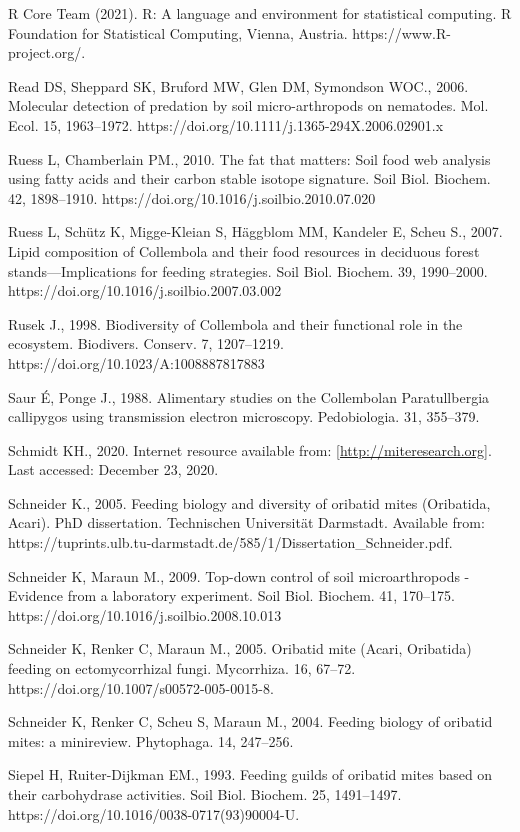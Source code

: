 \documentclass[10pt,oneside]{article}
\begin{document}
R Core Team (2021). R: A language and environment for statistical
computing. R Foundation for Statistical Computing, Vienna, Austria.
https://www.R-project.org/.

Read DS, Sheppard SK, Bruford MW, Glen DM, Symondson WOC., 2006.
Molecular detection of predation by soil micro-arthropods on nematodes.
Mol. Ecol. 15, 1963--1972.
https://doi.org/10.1111/j.1365-294X.2006.02901.x

Ruess L, Chamberlain PM., 2010. The fat that matters: Soil food web
analysis using fatty acids and their carbon stable isotope signature.
Soil Biol. Biochem. 42, 1898--1910.
https://doi.org/10.1016/j.soilbio.2010.07.020

Ruess L, Schütz K, Migge-Kleian S, Häggblom MM, Kandeler E, Scheu S.,
2007. Lipid composition of Collembola and their food resources in
deciduous forest stands---Implications for feeding strategies. Soil
Biol. Biochem. 39, 1990--2000.
https://doi.org/10.1016/j.soilbio.2007.03.002

Rusek J., 1998. Biodiversity of Collembola and their functional role in
the ecosystem. Biodivers. Conserv. 7, 1207--1219.
https://doi.org/10.1023/A:1008887817883

Saur É, Ponge J., 1988. Alimentary studies on the Collembolan
Paratullbergia callipygos using transmission electron microscopy.
Pedobiologia. 31, 355--379.

Schmidt KH., 2020. Internet resource available from:
\href{http://miteresearch.org/}{{[}http://miteresearch.org{]}}. Last
accessed: December 23, 2020.

Schneider K., 2005. Feeding biology and diversity of oribatid mites
(Oribatida, Acari). PhD dissertation. Technischen Universität Darmstadt.
Available from:
https://tuprints.ulb.tu-darmstadt.de/585/1/Dissertation\_Schneider.pdf.

Schneider K, Maraun M., 2009. Top-down control of soil microarthropods -
Evidence from a laboratory experiment. Soil Biol. Biochem. 41, 170--175.
https://doi.org/10.1016/j.soilbio.2008.10.013

Schneider K, Renker C, Maraun M., 2005. Oribatid mite (Acari, Oribatida)
feeding on ectomycorrhizal fungi. Mycorrhiza. 16, 67--72.
https://doi.org/10.1007/s00572-005-0015-8.

Schneider K, Renker C, Scheu S, Maraun M., 2004. Feeding biology of
oribatid mites: a minireview. Phytophaga. 14, 247--256.

Siepel H, Ruiter-Dijkman EM., 1993. Feeding guilds of oribatid mites
based on their carbohydrase activities. Soil Biol. Biochem. 25,
1491--1497. https://doi.org/10.1016/0038-0717(93)90004-U.
\end{document}
